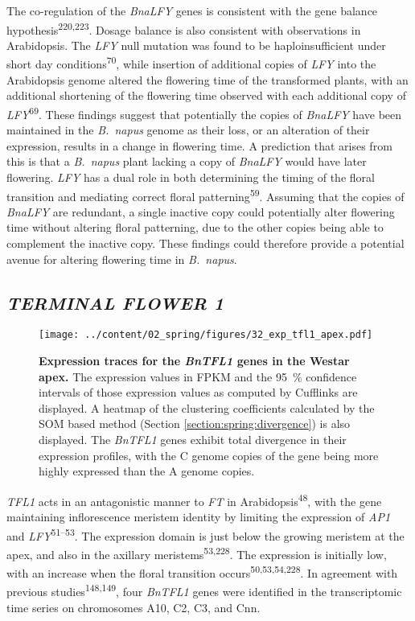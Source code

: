 \documentclass[12pt,]{book}
\begin{document}
The co-regulation of the \emph{BnaLFY} genes is consistent with the gene
balance hypothesis\textsuperscript{220,223}. Dosage balance is also
consistent with observations in Arabidopsis. The \emph{LFY} null
mutation was found to be haploinsufficient under short day
conditions\textsuperscript{70}, while insertion of additional copies of
\emph{LFY} into the Arabidopsis genome altered the flowering time of the
transformed plants, with an additional shortening of the flowering time
observed with each additional copy of \emph{LFY}\textsuperscript{69}.
These findings suggest that potentially the copies of \emph{BnaLFY} have
been maintained in the \emph{B.~napus} genome as their loss, or an
alteration of their expression, results in a change in flowering time. A
prediction that arises from this is that a \emph{B.~napus} plant lacking
a copy of \emph{BnaLFY} would have later flowering. \emph{LFY} has a
dual role in both determining the timing of the floral transition and
mediating correct floral patterning\textsuperscript{59}. Assuming that
the copies of \emph{BnaLFY} are redundant, a single inactive copy could
potentially alter flowering time without altering floral patterning, due
to the other copies being able to complement the inactive copy. These
findings could therefore provide a potential avenue for altering
flowering time in \emph{B.~napus}.

\subsection{\texorpdfstring{\emph{TERMINAL FLOWER
1}}{TERMINAL FLOWER 1}}\label{section:spring:tfl1}

\begin{figure}[htbp]
\centering
\texttt{[image: ../content/02\_spring/figures/32\_exp\_tfl1\_apex.pdf]}
\caption{\textbf{Expression traces for the \emph{BnTFL1} genes in the
Westar apex.} The expression values in FPKM and the 95~\% confidence
intervals of those expression values as computed by Cufflinks are
displayed. A heatmap of the clustering coefficients calculated by the
SOM based method (Section \ref{section:spring:divergence}) is also
displayed. The \emph{BnTFL1} genes exhibit total divergence in their
expression profiles, with the C genome copies of the gene being more
highly expressed than the A genome copies.}\label{figure:232:tfl1apex}
\end{figure}

\emph{TFL1} acts in an antagonistic manner to \emph{FT} in
Arabidopsis\textsuperscript{48}, with the gene maintaining inflorescence
meristem identity by limiting the expression of \emph{AP1} and
\emph{LFY}\textsuperscript{51--53}. The expression domain is just below
the growing meristem at the apex, and also in the axillary
meristems\textsuperscript{53,228}. The expression is initially low, with
an increase when the floral transition
occurs\textsuperscript{50,53,54,228}. In agreement with previous
studies\textsuperscript{148,149}, four \emph{BnTFL1} genes were
identified in the transcriptomic time series on chromosomes A10, C2, C3,
and Cnn.
\end{document}
